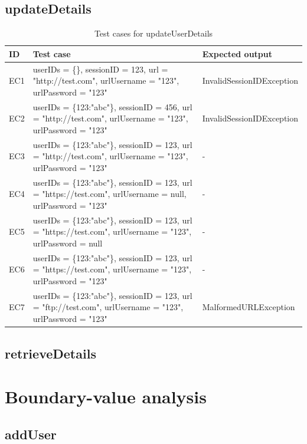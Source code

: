 \documentclass{article}
\begin{document}
\subsection{updateDetails}
\begin{longtable}{|p{2cm}|p{7cm}|p{5cm}|}
\caption{Test cases for updateUserDetails}\\
\hline 
ID&Test case&Expected output\\
\hline  
EC1&userIDs = \{\}, sessionID = 123, url = "http://test.com", urlUsername = "123", urlPassword = "123"&InvalidSessionIDException\\
\hline
EC2&userIDs = \{123:"abc"\}, sessionID = 456, url = "http://test.com", urlUsername = "123", urlPassword = "123"&InvalidSessionIDException\\
\hline
EC3&userIDs = \{123:"abc"\}, sessionID = 123, url = "http://test.com", urlUsername = "123", urlPassword = "123"&-\\
\hline
EC4&userIDs = \{123:"abc"\}, sessionID = 123, url = "https://test.com", urlUsername = null, urlPassword = "123"&-\\
\hline
EC5&userIDs = \{123:"abc"\}, sessionID = 123, url = "https://test.com", urlUsername = "123", urlPassword = null&-\\
\hline
EC6&userIDs = \{123:"abc"\}, sessionID = 123, url = "https://test.com", urlUsername = "123", urlPassword = "123"&-\\
\hline
EC7&userIDs = \{123:"abc"\}, sessionID = 123, url = "ftp://test.com", urlUsername = "123", urlPassword = "123"&MalformedURLException\\
\hline
\end{longtable}
\subsection{retrieveDetails}

\section{Boundary-value analysis}
\subsection{addUser}
\end{document}
